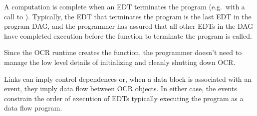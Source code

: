 A computation is complete when an EDT terminates the program
(e.g.\ with a call to ). Typically, the EDT that
terminates the program is the last EDT in the program DAG, and the
programmer has assured that all other EDTs in the DAG have completed
execution before the function to terminate the program is called.

%
Since the OCR runtime creates the 
function, the programmer doesn't need to manage the low level
details of initializing and cleanly shutting down OCR.
%


Links can imply control dependences or, when a data block is
associated with an event, they imply data flow between OCR objects.
In either case, the events constrain the order of execution of EDTs
typically executing the program as a data flow program.

